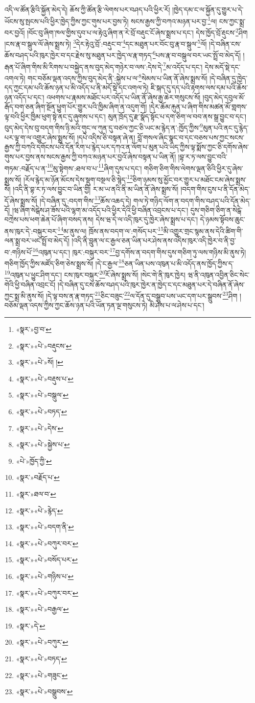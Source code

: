 འདི་ལ་ཚོན་རྩིའི་སྐྱོན་མེད་དེ། ཆོས་ཀྱི་ཚོན་རྩི་ལེགས་པར་བཤད་པའི་ཕྱིར་རོ། །ཁྱེད་དམ་ང་ལ་སྐྱོན་དུ་གྱུར་པ་དེ་ཡོངས་སུ་སྤངས་པའི་ཕྱིར་ཁྱེད་ཀྱིས་ཀྱང་གུས་པར་བྱས་ཏེ། སངས་རྒྱས་ཀྱི་བཀའ་མཉན་པར་བྱ་\footnote{«སྣར་»བྱ་བ་}ལ། ངས་ཀྱང་སྨྲ་བར་བྱའོ། །བོང་བུ་ཞིག་ཁལ་གྱིས་དུབ་པ་ལ་རྟེའུ་ཞིག་ན་རེ་བྲོ་བརྡུང་ངོ་ཞེས་སྨྲས་པ་དང་། དེས་ཁྱོད་བྲོ་རྡུངས་\footnote{«སྣར་»«པེ་»བརྡུངས་}ཤིག །ངས་རྣ་བ་སྒུལ་ལོ་ཞེས་སྨྲས་ཏེ། \footnote{«སྣར་»«པེ་»སོ། ། }དེར་རྟེའུ་བྲོ་:བརྡུང་བ་\footnote{«སྣར་»«པེ་»བརྡུས་པ་}དང་མཐུན་པར་བོང་བུ་རྣ་བ་སྒུལ་\footnote{«སྣར་»«པེ་»བསྒུལ་}ལོ། །དེ་བཞིན་ངས་ཆོས་བཤད་པའི་ཁུར་ཁྱེར་བ་དང་རྗེས་སུ་མཐུན་པར་ཁྱེད་ལ་རྣ་གཏད་\footnote{«སྣར་»«པེ་»བཏད་}པས་རྣ་བ་བསྒུལ་བར་ཡང་སྤྲོ་བ་མེད་དོ། །རྒན་པོ་ཞིག་གིས་མི་རིགས་པ་བསྐྱེད་ནས་བུད་མེད་གཉེར་བ་ལས་:དེས་དེ་\footnote{«སྣར་»«པེ་»དེས་}མ་འདོད་པ་དང་། དེས་མདོ་སྡེ་དང་འགལ་ཏེ། གང་བཅོམ་ལྡན་འདས་ཀྱིས་བུད་མེད་ནི་:སྐྱེས་པ་ལ་\footnote{«སྣར་»«པེ་»སྐྱེས་པ་}སེམས་པ་ཡིན་ནོ་ཞེས་སྨྲས་སོ། །དེ་བཞིན་དུ་ཁྱེད་དད་ཀྱང་དམ་པའི་ཆོས་ཉན་པ་མི་འདོད་པ་ནི་མདོ་སྡེ་དང་འགལ་ཏེ། ཇི་སྐད་དུ་དད་པའི་རྟགས་ལས་དམ་པའི་ཆོས་ཉན་འདོད་པ་དང་། འཕགས་པ་རྣམས་མཐོང་པར་འདོད་པ་ཡིན་ནོ་ཞེས་རྒྱ་ཆེར་གསུངས་སོ། །བུད་མེད་དབུལ་མོ་རྒོད་བག་ཅན་ཞིག་སྔོན་ཕྱུག་པོར་གྱུར་པའི་ཁྱིམ་ཞིག་ན་འདུག་གོ། །དེར་ཆོམ་རྐུན་པ་ཞིག་གིས་མཚན་མོ་གླགས་ལྟ་བའི་ཕྱིར་ཁྱིམ་ཕུག་སྟེ་ནང་དུ་ཞུགས་པ་དང་། མུན་ཁྲོད་དུ་རྫ་སྣོད་སྟོང་པ་དག་ཅིག་ལ་བབ་ནས་སྒྲ་བྱུང་བ་དང་། བུད་མེད་དེས་བུ་བདག་གིས་ཉི་མའི་གུང་ལ་ཀུན་དུ་བཙལ་ཀྱང་ཅི་ཡང་མ་རྙེད་ན་:ཁྱོད་ཀྱིས་\footnote{«པེ་»ཁྱོད་ཀྱི་}མུན་པའི་ནང་དུ་རྙེད་པར་ལྟ་ག་ལ་འགྱུར་ཞེས་སྨྲས་སོ། །དཔེ་འདིས་ཅི་བསྟན་ཞེ་ན། བློ་གསལ་ཞིང་སྣང་བ་དང་བཅས་པས་ཀྱང་སངས་རྒྱས་ཀྱི་བཀའི་དགོངས་པའི་དོན་རིག་པ་རྙེད་པར་དཀའ་ན་ལོག་པ་མུན་པའི་ཡིད་ཀྱིས་ལྟ་སྨོས་ཀྱང་ཅི་དགོས་ཞེས་གུས་པར་བྱས་ནས་སངས་རྒྱས་ཀྱི་བཀའ་མཉན་པར་བྱའོ་ཞེས་བསྟན་པ་ཡིན་ནོ། །བྷ་ར་ཏ་ལས་བྱུང་བའི་གཏམ་:བརྗོད་པ་ན་\footnote{«སྣར་»བརྗོད་པ་}མུ་སྟེགས་:ཐལ་བ་པ་\footnote{«སྣར་»ཐལ་བ་}ཞིག་དུས་པ་དང་། གཅིག་ཅིག་གིས་ལེགས་ལྡན་ཅིའི་ཕྱིར་དུ་ཞེས་སྨྲས་སོ། །རོལ་རྙེད་མ་ཉོན་མོངས་དེས་སྡུག་བསྔལ་ཅི་སྙེད་\footnote{«སྣར་»«པེ་»རྙེད་}ཅིག་ཉམས་སུ་མྱོང་བར་གྱུར་པ་མཐོང་ངམ་ཞེས་སྨྲས་སོ། །འདི་ནི་བྷ་ར་ཏ་ལས་བྱུང་བ་ཡིན་གྱི། ར་མ་ཡ་ནའི་ནི་མ་ཡིན་ནོ་ཞེས་སྨྲས་སོ། །བདག་གིས་ངུས་པ་ནི་དོན་མེད་དོ་ཞེས་སྨྲས་སོ། །དེ་བཞིན་དུ་:བདག་གིས་\footnote{«སྣར་»«པེ་»བདག་ནི་}ཆོས་འཆད་དེ། གལ་ཏེ་གཉིད་ལོག་ན་བདག་གིས་བཤད་པའི་དོན་མེད་དོ། །ཝ་ཞིག་སེངྒེས་ཤ་ཟོས་པའི་ལྷག་མ་འདོད་པའི་ཕྱིར་དེའི་ཕྱི་བཞིན་འབྲངས་པ་དང་། དུས་གཅིག་ཅིག་ན་སེངྒེ་བཀྲེས་པས་ཕག་ཆེན་པོ་ཞིག་བསད་ནས། དེས་ཝ་དེ་ལ་འདི་ཁུར་དུ་ཁྱེར་ཞེས་སྨྲས་པ་དང་། དེ་ཉམས་སྟོབས་ཆུང་ནས་ཁུར་དེ་:བསྐུར་བར་\footnote{«སྣར་»«པེ་»བཀུར་བར་}མ་ནུས་ལ། ཁྲོས་ནས་བདག་ལ་:གསོད་པར་\footnote{«སྣར་»«པེ་»བསོད་པར་}མི་འགྱུར་གྲང་སྙམ་ནས་དེའི་ཚིག་གི་ལན་སྨྲ་བར་ཡང་སྤྲོ་བ་མེད་དོ། །འདི་ནི་བླུན་ལ་ང་རྒྱལ་ཅན་ཡིན་པར་ཤེས་ནས་འདིས་ཁུར་འདི་ཁྱེར་བ་ནི་བྱ་བ་:གཉིས་པོ་\footnote{«སྣར་»«པེ་»གཉིས་པ་}འཁུན་པ་དང་། ཁུར་:བསྐུར་བར་\footnote{«སྣར་»«པེ་»བཀུར་བར་}བྱ་དགོས་ན་བདག་གིས་དུས་གཅིག་ཏུ་ལས་གཉིས་མི་ནུས་ཏེ། གཅིག་ཁྱོད་ཀྱིས་མཛོད་ཅིག་ཅེས་སྨྲས་སོ། །དེ་ང་རྒྱལ་\footnote{«སྣར་»«པེ་»བརྒྱལ་}ཅན་ཡིན་པས་འཁུན་པ་མི་འདོད་ནས་ཁྱོད་ཀྱིས་ད་\footnote{«སྣར་»དེ་}འཁུན་པ་ཕྱུང་ཤིག་དང་། ངས་ཁུར་བསྐུར་\footnote{«སྣར་»«པེ་»བཀུར་}རོ་ཞེས་སྨྲས་སོ། །སེང་གེ་ནི་ཁུར་ཁྱེར། ཝ་ནི་འཁུན་འབྱིན་ཅིང་སེང་གེའི་ཕྱི་བཞིན་འབྲང་ངོ། །དེ་བཞིན་དུ་ངས་ཆོས་བཤད་པའི་ཁུར་ཁྱེར་ན་ཁྱེད་ང་དང་མཐུན་པར་དེ་བཞིན་ནོ་ཞེས་ཀྱང་སྨྲ་མི་ནུས་སོ། །དེ་ལྟ་བས་ན་རྣ་གཏད་\footnote{«སྣར་»«པེ་»བཏད་}ཅིང་བཟུང་\footnote{«སྣར་»«པེ་»གཟུང་}ལ་དོན་དུ་བསྒྲུབ་པས་ཡང་དག་པར་སྒྲུབས་\footnote{«སྣར་»«པེ་»བསྒྲུབས་}ཤིག །བཅོམ་ལྡན་འདས་ཀྱིས་ཀྱང་ཆོས་ཉན་པའི་ཡོན་ཏན་ལྔ་གསུངས་ཏེ། མི་ཤེས་པ་ལ་ཤེས་པ་དང་། 